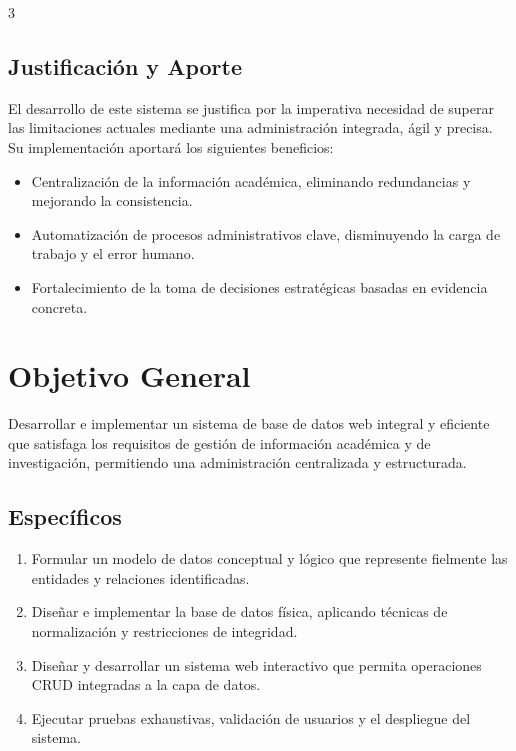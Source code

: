 \documentclass[a0,portrait]{a0poster}
\begin{document}
\begin{multicols}{3}
\subsection*{Justificación y Aporte}
El desarrollo de este sistema se justifica por la imperativa necesidad de superar las limitaciones actuales mediante una administración integrada, ágil y precisa. Su implementación aportará los siguientes beneficios:

\begin{itemize}
    \item Centralización de la información académica, eliminando redundancias y mejorando la consistencia.
    \item Automatización de procesos administrativos clave, disminuyendo la carga de trabajo y el error humano.
    \item Fortalecimiento de la toma de decisiones estratégicas basadas en evidencia concreta.
\end{itemize}

\section*{Objetivo General}
Desarrollar e implementar un sistema de base de datos web integral y eficiente que satisfaga los requisitos de gestión de información académica y de investigación, permitiendo una administración centralizada y estructurada.
\subsection*{Específicos}
\begin{enumerate}
    \item Formular un modelo de datos conceptual y lógico que represente fielmente las entidades y relaciones identificadas.
    \item Diseñar e implementar la base de datos física, aplicando técnicas de normalización y restricciones de integridad.
    \item Diseñar y desarrollar un sistema web interactivo que permita operaciones CRUD integradas a la capa de datos.
    \item Ejecutar pruebas exhaustivas, validación de usuarios y el despliegue del sistema.
\end{enumerate}


\end{multicols}
\end{document}

